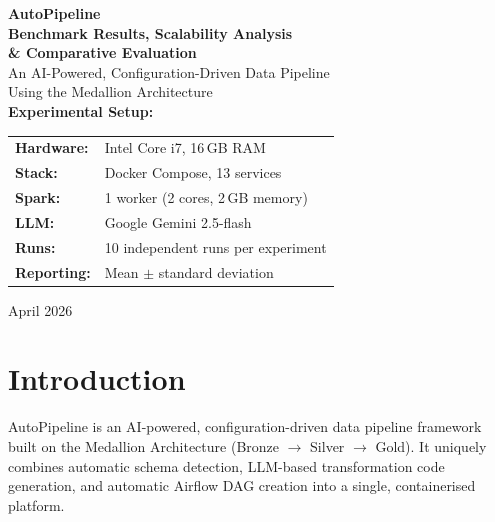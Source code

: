 \documentclass[12pt, a4paper]{article}
\begin{document}
\begin{titlepage}
\centering
\vspace*{2cm}

{\Huge\bfseries\color{sectionblue} AutoPipeline}\\[0.5cm]
{\LARGE\bfseries Benchmark Results, Scalability Analysis}\\[0.3cm]
{\LARGE\bfseries \& Comparative Evaluation}\\[2cm]

{\Large An AI-Powered, Configuration-Driven Data Pipeline\\Using the Medallion Architecture}\\[3cm]

\textbf{Experimental Setup:}\\[0.3cm]
\begin{tabular}{ll}
\textbf{Hardware:} & Intel Core i7, 16\,GB RAM \\
\textbf{Stack:} & Docker Compose, 13 services \\
\textbf{Spark:} & 1 worker (2 cores, 2\,GB memory) \\
\textbf{LLM:} & Google Gemini 2.5-flash \\
\textbf{Runs:} & 10 independent runs per experiment \\
\textbf{Reporting:} & Mean $\pm$ standard deviation \\
\end{tabular}

\vfill
{\large April 2026}
\end{titlepage}

\tableofcontents
\newpage


\section{Introduction}

AutoPipeline is an AI-powered, configuration-driven data pipeline framework built on the Medallion Architecture (Bronze $\rightarrow$ Silver $\rightarrow$ Gold). It uniquely combines automatic schema detection, LLM-based transformation code generation, and automatic Airflow DAG creation into a single, containerised platform.
\end{document}
